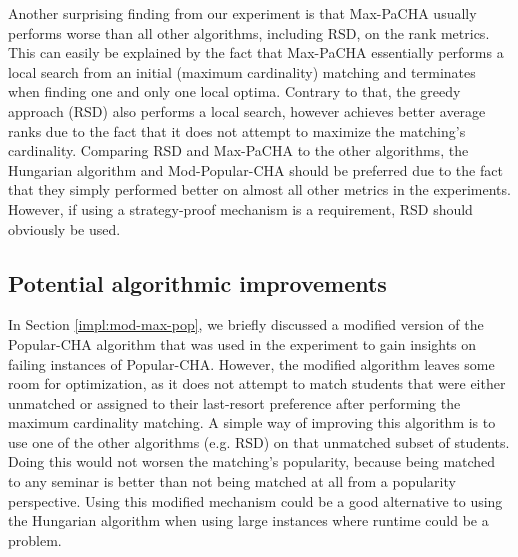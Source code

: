 Another surprising finding from our experiment is that Max-PaCHA usually performs worse than all other algorithms, including RSD, on the rank metrics. This can easily be explained by the fact that Max-PaCHA essentially performs a local search from an initial (maximum cardinality) matching and terminates when finding one and only one local optima. Contrary to that, the greedy approach (RSD) also performs a local search, however achieves better average ranks due to the fact that it does not attempt to maximize the matching's cardinality. Comparing RSD and Max-PaCHA to the other algorithms, the Hungarian algorithm and Mod-Popular-CHA should be preferred due to the fact that they simply performed better on almost all other metrics in the experiments. However, if using a strategy-proof mechanism is a requirement, RSD should obviously be used.

\subsection{Potential algorithmic improvements}\label{sec:improvements}
In Section \ref{impl:mod-max-pop}, we briefly discussed a modified version of the Popular-CHA algorithm that was used in the experiment to gain insights on failing instances of Popular-CHA. However, the modified algorithm leaves some room for optimization, as it does not attempt to match students that were either unmatched or assigned to their last-resort preference after performing the maximum cardinality matching. A simple way of improving this algorithm is to use one of the other algorithms (e.g. RSD) on that unmatched subset of students. Doing this would not worsen the matching's popularity, because being matched to any seminar is better than not being matched at all from a popularity perspective. Using this modified mechanism could be a good alternative to using the Hungarian algorithm when using large instances where runtime could be a problem. 

